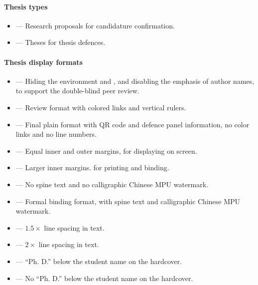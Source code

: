 \paragraph{Thesis types}
\begin{itemize}[noitemsep]
\item[\DeBu]  --- Research proposals for candidature confirmation.
\item {} --- Theses for thesis defences.
\end{itemize}

\paragraph{Thesis display formats}
\begin{itemize}[noitemsep]
\item[\DeBu]  --- Hiding the  environment and , and disabling the emphasis of author names, to support the double-blind peer review.
\item[\DeBu]  --- Review format with colored links and vertical rulers.
\item {} --- Final plain format with QR code and defence panel information, no color links and no line numbers.
\item[\DeBu]  --- Equal inner and outer margins, for displaying on screen.
\item {} --- Larger inner margins. for printing and binding.
\item[\DeBu]  --- No spine text and no calligraphic Chinese MPU watermark.
\item {} --- Formal binding format, with spine text and calligraphic Chinese MPU watermark.
\item[\DeBu]  --- $1.5\times$ line spacing in text.
\item {} --- $2\times$ line spacing in text.
\item[\DeBu]  --- ``Ph. D.'' below the student name on the hardcover.
\item {} --- No ``Ph. D.'' below the student name on the hardcover.
\end{itemize}


